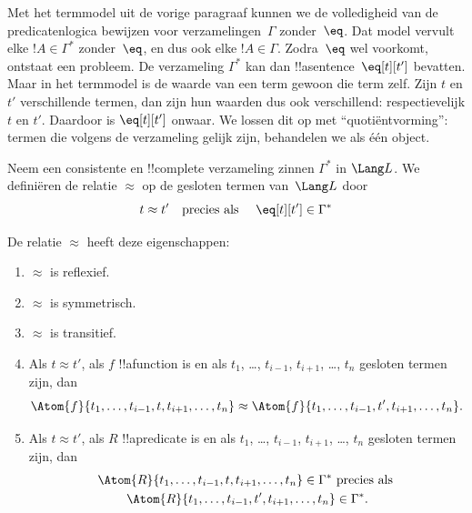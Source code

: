 \documentclass[openany]{memoir}
\begin{document}

\begin{explain}
Met het termmodel uit de vorige paragraaf kunnen we de volledigheid van
de predicatenlogica bewijzen voor verzamelingen~$\Gamma$ zonder~$\eq$.
Dat model vervult elke $!A \in \Gamma^*$ zonder~$\eq$, en dus ook elke
$!A \in \Gamma$. Zodra~$\eq$ wel voorkomt, ontstaat een probleem.
De verzameling $\Gamma^*$ kan dan !!a{sentence}~$\eq[t][t']$ bevatten.
Maar in het termmodel is de waarde van een term gewoon die term zelf.
Zijn $t$ en $t'$ verschillende termen, dan zijn hun waarden dus ook
verschillend: respectievelijk $t$ en $t'$. Daardoor is $\eq[t][t']$
onwaar. We lossen dit op met ``quotiëntvorming'': termen die volgens de
verzameling gelijk zijn, behandelen we als één object.
\end{explain}

\begin{defn}
  Neem een consistente en !!{complete} verzameling zinnen $\Gamma^*$ in
  $\Lang L$. We definiëren de relatie $\approx$ op de gesloten termen
  van~$\Lang L$ door
  \[
  t \approx t' \text{\quad precies als \quad} \eq[t][t'] \in \Gamma^*
  \]
\end{defn}

\begin{prop}
De relatie $\approx$ heeft deze eigenschappen:
\begin{enumerate}
\item $\approx$ is reflexief.
\item $\approx$ is symmetrisch.
\item  $\approx$ is transitief.
\item Als $t \approx t'$, als $f$ !!a{function} is en als $t_1$, \dots,
  $t_{i-1}$, $t_{i+1}$, \dots, $t_n$ gesloten termen zijn, dan
\[
\Atom{f}{t_1,\dots, t_{i-1}, t, t_{i+1}, \dots, t_n} \approx
\Atom{f}{t_1,\dots, t_{i-1}, t', t_{i+1}, \dots, t_n}.
\]
\item Als $t \approx t'$, als $R$ !!a{predicate} is en als $t_1$, \dots,
  $t_{i-1}$, $t_{i+1}$, \dots, $t_n$ gesloten termen zijn, dan
\begin{multline*}
\Atom{R}{t_1,\dots, t_{i-1}, t, t_{i+1}, \dots, t_n} \in \Gamma^* \text{ precies als } \\
\Atom{R}{t_1,\dots, t_{i-1}, t', t_{i+1}, \dots, t_n} \in \Gamma^*.
\end{multline*}
\end{enumerate}
\end{prop}
\end{document}

